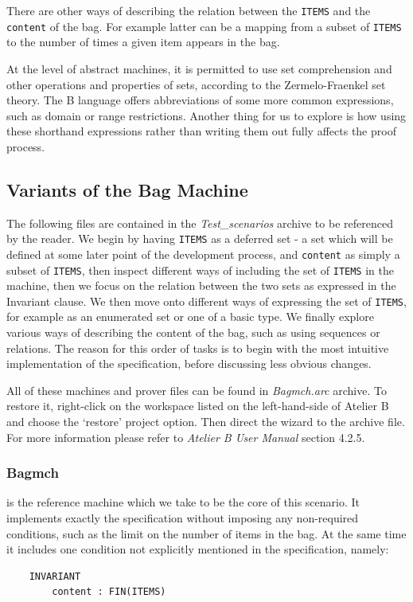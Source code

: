 \documentclass[12pt,journal,duplex]{IEEEtran}
\begin{document}
	There are other ways of describing the relation between the \texttt{ITEMS} and the \texttt{content} of the bag. For example latter can be a mapping from a subset of \texttt{ITEMS} to the number of times a given item appears in the bag.

	At the level of abstract machines, it is permitted to use set comprehension and other operations and properties of sets, according to the Zermelo-Fraenkel set theory. The B language offers abbreviations of some more common expressions, such as domain or range restrictions. Another thing for us to explore is how using these shorthand expressions rather than writing them out fully affects the proof process.

	\subsection{Variants of the Bag Machine}
	The following files are contained in the \emph{Test\_scenarios} archive to be referenced by the reader. We begin by having \texttt{ITEMS} as a deferred set - a set which will be defined at some later point of the development process, and \texttt{content} as simply a subset of \texttt{ITEMS}, then inspect different ways of including the set of \texttt{ITEMS} in the machine, then we focus on the relation between the two sets as expressed in the Invariant clause. We then move onto different ways of expressing the set of \texttt{ITEMS}, for example as an enumerated set or one of a basic type. We finally explore various ways of describing the content of the bag, such as using sequences or relations. The reason for this order of tasks is to begin with the most intuitive implementation of the specification, before discussing less obvious changes.

	All of these machines and prover files can be found in \emph{Bagmch.arc} archive. To restore it, right-click on the workspace listed on the left-hand-side of Atelier B and choose the `restore' project option. Then direct the wizard to the archive file. For more information please refer to \emph{Atelier B User Manual} section 4.2.5.

	\subsubsection{Bagmch} is the reference machine which we take to be the core of this scenario. It implements exactly the specification without imposing any non-required conditions, such as the limit on the number of items in the bag. At the same time it includes one condition not explicitly mentioned in the specification, namely:
	\begin{lstlisting}
	INVARIANT
		content : FIN(ITEMS)
	\end{lstlisting}
\end{document}
